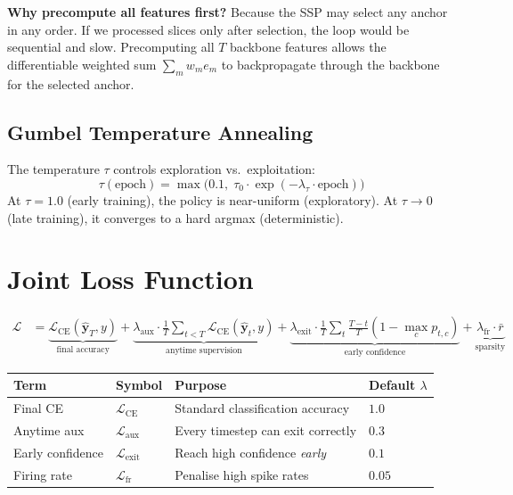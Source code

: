 \documentclass[11pt,a4paper]{article}
\begin{document}
\textbf{Why precompute all features first?}  Because the SSP may select any
anchor in any order.  If we processed slices only after selection, the loop
would be sequential and slow.  Precomputing all $T$ backbone features allows
the differentiable weighted sum $\sum_m w_m e_m$ to backpropagate through the
backbone for the selected anchor.

\subsection{Gumbel Temperature Annealing}

The temperature $\tau$ controls exploration vs.\ exploitation:
\[
  \tau(\text{epoch}) = \max\bigl(0.1,\; \tau_0 \cdot \exp(-\lambda_\tau \cdot \text{epoch})\bigr)
\]
At $\tau = 1.0$ (early training), the policy is near-uniform (exploratory).
At $\tau \to 0$ (late training), it converges to a hard argmax (deterministic).

\section{Joint Loss Function}

\begin{align}
  \mathcal{L} &= \underbrace{\mathcal{L}_\text{CE}(\hat{\mathbf{y}}_T, y)}_{\text{final accuracy}}
  + \underbrace{\lambda_\text{aux} \cdot \frac{1}{T} \sum_{t<T}
      \mathcal{L}_\text{CE}(\hat{\mathbf{y}}_t, y)}_{\text{anytime supervision}}
  + \underbrace{\lambda_\text{exit} \cdot \frac{1}{T} \sum_t
      \frac{T-t}{T}(1 - \max_c p_{t,c})}_{\text{early confidence}}
  + \underbrace{\lambda_\text{fr} \cdot \bar{r}}_{\text{sparsity}}
  \label{eq:loss}
\end{align}

\begin{center}
\begin{tabular}{llll}
\toprule
Term & Symbol & Purpose & Default $\lambda$ \\
\midrule
Final CE & $\mathcal{L}_\text{CE}$ & Standard classification accuracy & $1.0$ \\
Anytime aux & $\mathcal{L}_\text{aux}$ & Every timestep can exit correctly & $0.3$ \\
Early confidence & $\mathcal{L}_\text{exit}$ & Reach high confidence \emph{early} & $0.1$ \\
Firing rate & $\mathcal{L}_\text{fr}$ & Penalise high spike rates & $0.05$ \\
\bottomrule
\end{tabular}
\end{center}
\end{document}
